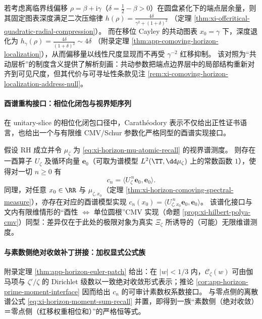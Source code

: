 \begin{remark}\label{rem:xi-horizon-comoving-vs-redshift}
若考虑离临界线偏移 \(\rho=\beta+\mathrm{i}\gamma\)（\(\delta=\tfrac12-\beta>0\)）在圆盘紧化下的端点层余量，则其固定图表深度满足二次压缩律
\(
h(\rho)=\frac{4\delta}{\gamma^2+(1+\delta)^2}
\)
（定理 \ref{thm:xi-offcritical-quadratic-radial-compression}）。
而在移位 Cayley 的共动图表 \(x_0=\gamma\) 下，深度退化为
\(
h_{\gamma}(\rho)=\frac{4\delta}{(1+\delta)^2}\sim 4\delta
\)
（附录定理 \ref{thm:app-comoving-horizon-localization}），从而偏移量以线性尺度显现而不再受 \(\gamma^{-2}\) 红移抑制。
该对照为“共动层析”的制度含义提供了解析刻画：共动参数把端点边界层中的局部结构重新对齐到可见尺度，但其代价与可寻址性条款见注 \ref{rem:xi-comoving-horizon-localization-address-null}。
\end{remark}

\paragraph{酉谱重构接口：相位化闭包与视界矩序列}
在 unitary-slice 的相位化闭包口径中，Carath\'eodory 表示不仅给出正性证书语言，也给出一个与有限维 CMV/Schur 参数化严格同型的酉谱实现接口。

\begin{corollary}\label{cor:xi-horizon-unitary-spectral-realization}
假设 RH 成立并令 \(\mu_{\zeta}\) 为 \eqref{eq:xi-horizon-mu-atomic-recall} 的视界谱测度。
则存在一酉算子 \(U_{\zeta}\) 及循环向量 \(\mathbf{e}_0\)（可取为谱模型 \(L^2(\TT,\dd\mu_{\zeta})\) 上的常数函数 \(1\)），使得对一切 \(n\ge 0\) 有
\begin{equation}\label{eq:xi-horizon-unitary-moments}
\boxed{\;
c_n=\langle U_{\zeta}^{\,n}\mathbf{e}_0,\mathbf{e}_0\rangle. \;}
\end{equation}
同理，对任意 \(x_0\in\RR\) 与 \(\mu_{\zeta,x_0}\)（定理 \ref{thm:xi-horizon-comoving-spectral-measure}），亦存在对应的酉谱模型实现 \(c_n(x_0)=\langle U_{\zeta,x_0}^{\,n}\mathbf{e}_0,\mathbf{e}_0\rangle\)。
该谱化接口与文内有限维情形的“酉性 \(\Leftrightarrow\) 单位圆根”CMV 实现（命题 \ref{prop:xi-hilbert-polya-cmv}）同型：差异仅在于此处的极限对象为真实 \(\Xi_{\zeta}\) 所诱导的（可能）无限维谱测度。
\end{corollary}

\paragraph{与素数侧绝对收敛补丁拼接：加权显式公式族}
附录定理 \ref{thm:app-horizon-euler-patch} 给出：在 \(|w|<1/3\) 内，\(\mathscr{C}_{\zeta}(w)\) 可由伽马项与 \(\zeta'/\zeta\) 的 Dirichlet 级数以一致绝对收敛形式表示；推论 \ref{cor:app-horizon-prime-moment-interface} 因而给出 \(c_n\) 的可审计素数权系数接口。
与零点侧的离散谱公式 \eqref{eq:xi-horizon-moment-sum-recall} 并置，即得到一族“素数侧（绝对收敛）＝零点侧（红移权重相位和）”的严格恒等式。


